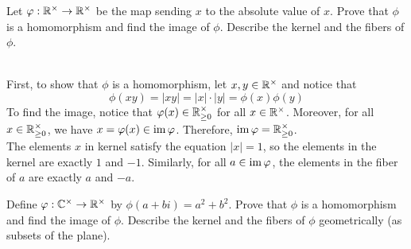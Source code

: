 \begin{exercise}
    Let $\varphi : \mathbb{R}^{\times} \to \mathbb{R}^{\times}$ be the map sending $x$ to the absolute value of $x$. Prove that $\phi$ is a homomorphism and find the image of $\phi$. Describe the kernel and the fibers of $\phi$. \\ 
\end{exercise}

\begin{solution}
    \\ First, to show that $\phi$ is a homomorphism, let $x,y \in \mathbb{R}^{\times}$ and notice that
    $$\phi(xy) = |xy| = |x| \cdot |y| = \phi(x)\phi(y)$$
    To find the image, notice that $\varphi(x) \in \mathbb{R}^{\times}_{\geq 0}$ for all $x \in \mathbb{R}^{\times}$. Moreover, for all $x \in \mathbb{R}^{\times}_{\geq 0}$, we have $x = \varphi(x) \in \operatorname{im} \varphi$. Therefore, $\operatorname{im} \varphi = \mathbb{R}^{\times}_{\geq 0}$.\\
    The elements $x$ in kernel satisfy the equation $|x| = 1$, so the elements in the kernel are exactly $1$ and $-1$. Similarly, for all $a \in \operatorname{im} \varphi$, the elements in the fiber of $a$ are exactly $a$ and $-a$. \\
\end{solution}

\begin{exercise}
    Define $\varphi : \mathbb{C}^{\times} \to \mathbb{R}^{\times}$ by $\phi(a+bi)=a^2 + b^2$. Prove that $\phi$ is a homomorphism and find the image of $\phi$. Describe the kernel and the fibers of $\phi$ geometrically (as subsets of the plane). \\
\end{exercise}

